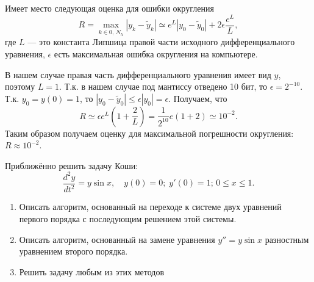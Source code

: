\documentclass[a4paper]{article}
\begin{document}
\begin{sol}
Имеет место следующая оценка для ошибки округления
\[
	R= \max_{k \in  \overline{0,\,N_h}}|y_k -\tilde{y}_k|
\simeq e^L |y_0-\tilde{y}_0|+2 \epsilon \frac{e^L}{L}
,\] 
где $L$ --- это константа Липшица правой части исходного
дифференциального уравнения, $\epsilon$ есть максимальная
ошибка округления на компьютере.

В нашем случае правая часть дифференциального уравнения имеет вид $y$, поэтому $L=1$. Т.\:к. в нашем случае под мантиссу отведено
10 бит, то  $\epsilon= 2^{-10}$. Т.\:к. $y_0=y(0)=1$, то
$|y_0- \tilde{y}_0|\le  \epsilon |y_0|=\epsilon$. Получаем, что
\[
	R \simeq \epsilon e^L \left( 1+\frac{2}{L} \right) 
	= \frac{1}{2^10}e(1+2) \simeq 10^{-2}
.\] 
Таким образом получаем оценку для максимальной погрешности
округления: $R \approx 10^{-2}$.
\end{sol}
\begin{hiProb}[10.3]
Приближённо решить задачу Коши:
\[
	\frac{d^2 y}{dt^2}= y \sin x,\quad y(0)=0;\;
	y'(0)=1;\, 0\le x\le 1
.\] 
\renewcommand{\labelenumi}{\asbuk{enumi})}
\begin{enumerate}
\item Описать алгоритм, основанный на переходе к системе двух
	уравнений первого порядка с последующим решением
	этой системы.
\item Описать алгоритм, основанный на замене уравнения $y''=
	y \sin x$ разностным уравнением второго порядка.
\item Решить задачу любым из этих методов
\end{enumerate}
\end{hiProb}
\end{document}
